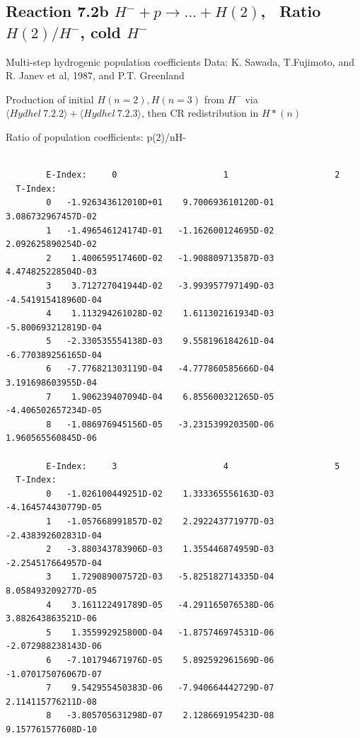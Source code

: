 \documentclass[12pt,dvipdfmx]{article}
\begin{document}
\subsection{
Reaction 7.2b $ H^- + p \rightarrow ...+ H(2) $, \   Ratio $H(2)/H^- $, cold $H^-$
}
 Multi-step hydrogenic population coefficients
 Data: K. Sawada, T.Fujimoto, \cite{kn:Sawada} and R. Janev et al, 1987, and P.T. Greenland

Production of initial $H(n=2), H(n=3)$ from $H^-$ via $ \langle Hydhel~ 7.2.2\rangle + \langle Hydhel~ 7.2.3\rangle$,
 then CR redistribution in $H*(n)$

 Ratio of population coefficients: p(2)/nH-

\begin{small}\begin{verbatim}

        E-Index:     0                     1                     2
  T-Index:
        0   -1.926343612010D+01    9.700693610120D-01    3.086732967457D-02
        1   -1.496546124174D-01   -1.162600124695D-02    2.092625890254D-02
        2    1.400659517460D-02   -1.908809713587D-03    4.474825228504D-03
        3    3.712727041944D-02   -3.993957797149D-03   -4.541915418960D-04
        4    1.113294261028D-02    1.611302161934D-03   -5.800693212819D-04
        5   -2.330535554138D-03    9.558196184261D-04   -6.770389256165D-04
        6   -7.776821303119D-04   -4.777860585666D-04    3.191698603955D-04
        7    1.906239407094D-04    6.855600321265D-05   -4.406502657234D-05
        8   -1.086976945156D-05   -3.231539920350D-06    1.960565560845D-06

        E-Index:     3                     4                     5
  T-Index:
        0   -1.026100449251D-02    1.333365556163D-03   -4.164574430779D-05
        1   -1.057668991857D-02    2.292243771977D-03   -2.438392602831D-04
        2   -3.880343783906D-03    1.355446874959D-03   -2.254517664957D-04
        3    1.729089007572D-03   -5.825182714335D-04    8.058493209277D-05
        4    3.161122491789D-05   -4.291165076538D-06    3.882643863521D-06
        5    1.355992925800D-04   -1.875746974531D-06   -2.072988238143D-06
        6   -7.101794671976D-05    5.892592961569D-06   -1.070175076067D-07
        7    9.542955450383D-06   -7.940664442729D-07    2.114115776211D-08
        8   -3.805705631298D-07    2.128669195423D-08    9.157761577608D-10


\end{verbatim}
\end{small}
\end{document}
